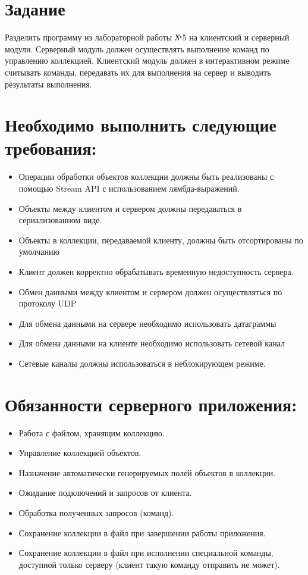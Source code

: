 \documentclass{article}
\begin{document}
\itmo[
  variant=74273.99,
  labn=6,
  discipline=Программирование,
  group=P3115,
  student=Владимир Мацюк,
  teacher=Кустарев Иван Павлович,
  year=2023,
  logo=../../../lib/img/itmo.png
]

\section*{Задание}

Разделить программу из лабораторной работы №5 на клиентский и серверный модули. Серверный модуль должен осуществлять выполнение команд по управлению коллекцией. Клиентский модуль должен в интерактивном режиме считывать команды, передавать их для выполнения на сервер и выводить результаты выполнения.

\section*{Необходимо выполнить следующие требования:}
\begin{itemize}
  \item Операции обработки объектов коллекции должны быть реализованы с помощью Stream API с использованием лямбда-выражений.
  \item Объекты между клиентом и сервером должны передаваться в сериализованном виде.
  \item Объекты в коллекции, передаваемой клиенту, должны быть отсортированы по умолчанию
  \item Клиент должен корректно обрабатывать временную недоступность сервера.
  \item Обмен данными между клиентом и сервером должен осуществляться по протоколу UDP
  \item Для обмена данными на сервере необходимо использовать датаграммы
  \item Для обмена данными на клиенте необходимо использовать сетевой канал
  \item Сетевые каналы должны использоваться в неблокирующем режиме.
\end{itemize}

\section*{Обязанности серверного приложения:}
\begin{itemize}
  \item Работа с файлом, хранящим коллекцию.
  \item Управление коллекцией объектов.
  \item Назначение автоматически генерируемых полей объектов в коллекции.
  \item Ожидание подключений и запросов от клиента.
  \item Обработка полученных запросов (команд).
  \item Сохранение коллекции в файл при завершении работы приложения.
  \item Сохранение коллекции в файл при исполнении специальной команды, доступной только серверу (клиент такую команду отправить не может).
\end{itemize}
\end{document}
